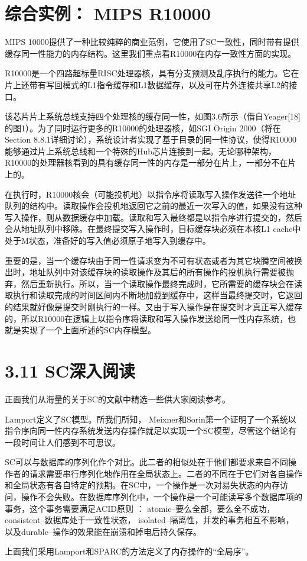 \documentclass[UTF-8]{ctexrep}
\begin{document}
\section{综合实例： MIPS R10000}
\par MIPS 10000提供了一种比较纯粹的商业范例，它使用了SC一致性，同时带有提供缓存同一性能力的内存结构。这里我们重点看R10000在内存一致性方面的实现。
\par R10000是一个四路超标量RISC处理器核，具有分支预测及乱序执行的能力。它在片上还带有写回模式的L1指令缓存和L1数据缓存，以及可在片外连接共享L2的接口。
\par 该芯片片上系统总线支持四个处理核的缓存同一性，如图3.6所示（借自Yeager[18]的图1）。为了同时运行更多的R10000的处理器核，如SGI Origin 2000（将在Section 8.8.1详细讨论），系统设计者实现了基于目录的同一性协议，使得R10000能够通过片上系统总线和一个特殊的Hub芯片连接到一起。无论哪种架构，R10000的处理器核看到的具有缓存同一性的内存是一部分在片上，一部分不在片上的。
\par 在执行时，R10000核会（可能投机地）以指令序将读取写入操作发送往一个地址队列的结构中。读取操作会投机地返回它之前的最近一次写入的值，如果没有这种写入操作，则从数据缓存中加载。读取和写入最终都是以指令序进行提交的，然后会从地址队列中移除。在最终提交写入操作时，目标缓存块必须在本核L1 cache中处于M状态，准备好的写入值必须原子地写入到缓存中。
\par 重要的是，当一个缓存块由于同一性请求变为不可有状态或者为其它块腾空间被换出时，地址队列中对该缓存块的读取操作及其后的所有操作的投机执行需要被抛弃，然后重新执行。所以，当一个读取操作最终完成时，它所需要的缓存块会在读取执行和读取完成的时间区间内不断地加载到缓存中，这样当最终提交时，它返回的结果就好像是提交时刚执行的一样。又由于写入操作是在提交时才真正写入缓存的，所以R10000在逻辑上以指令序将读取和写入操作发送给同一性内存系统，也就是实现了一个上面所述的SC内存模型。
\section {3.11 SC深入阅读}
\par 正面我们从海量的关于SC的文献中精选一些供大家阅读参考。
\par Lamport定义了SC模型。所我们所知， Meixner和Sorin第一个证明了一个系统以指令序向同一性内存系统发送内存操作就足以实现一个SC模型，尽管这个结论有一段时间让人们感到不可思议。
\par SC可以与数据库的序列化作个对比。此二者的相似处在于他们都要求来自不同操作者的请求需要串行序列化地作用在全局状态上。二者的不同在于它们对各自操作和全局状态有各自特定的预期。在SC中，一个操作是一次对易失状态的内存访问，操作不会失败。在数据库序列化中，一个操作是一个可能读写多个数据库项的事务，这个事务需要满足ACID原则 ： atomic--要么全部，要么全不成功， consistent--数据库处于一致性状态， isolated--隔离性，并发的事务相互不影响， 以及durable--操作的效果能在崩溃和掉电后持久保存。
\par 上面我们采用Lamport和SPARC的方法定义了内存操作的“全局序”。









\par















 
\end{document}
